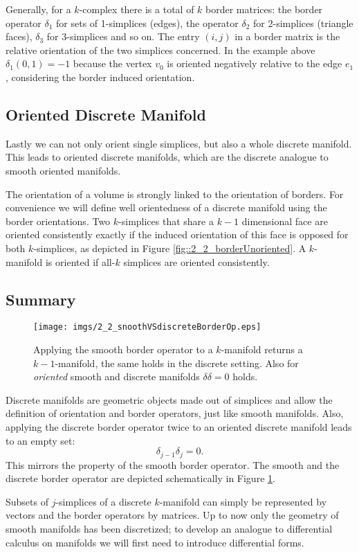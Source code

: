 Generally, for a $k$-complex there is a total of $k$ border matrices: the border operator $\delta_1$ for sets of 1-simplices (edges), the operator $\delta_2$ for 2-simplices (triangle faces), $\delta_3$ for 3-simplices and so on. %
The entry $(i,j)$ in a border matrix is the relative orientation of the two simplices concerned. In the example above $\delta_1(0,1) = -1$ because the vertex $v_0$ is oriented negatively relative to the edge $e_1$, considering the border induced orientation.

\subsection{Oriented Discrete Manifold}
\label{sec::2_orientedDiscreteMF}
Lastly we can not only orient single simplices, but also a whole discrete manifold. This leads to oriented discrete manifolds, which are the discrete analogue to smooth oriented manifolds. 

The orientation of a volume is strongly linked to the orientation of borders. For convenience we will define well orientedness of a discrete manifold using the border orientations.
Two $k$-simplices that share a $k-1$ dimensional face are oriented consistently exactly if the induced orientation of this face is opposed for both $k$-simplices, as depicted in Figure \ref{fig::2_2_borderUnoriented}.
A $k$-manifold is oriented if all-$k$ simplices are oriented consistently. 

\subsection{Summary}

\begin{figure}%
\begin{center}
\texttt{[image: imgs/2\_2\_snoothVSdiscreteBorderOp.eps]}	
\end{center}
\caption{Applying the smooth border operator to a $k$-manifold returns a $k-1$-manifold, the same holds in the discrete setting. Also for \emph{oriented} smooth and discrete manifolds $\delta\delta = 0$ holds.}%
\label{fig:2_2_snoothVSdiscreteBorderOp}%
\end{figure}
Discrete manifolds are geometric objects made out of simplices and allow the definition of orientation and border operators, just like smooth manifolds. Also, applying the discrete border operator twice to an oriented discrete manifold leads to an empty set:
\[\delta_{j-1}\delta_{j} = 0.\]
This mirrors the property of the smooth border operator. The smooth and the discrete border operator are depicted schematically in Figure \ref{fig:2_2_snoothVSdiscreteBorderOp}.

Subsets of $j$-simplices of a discrete $k$-manifold can simply be represented by vectors and the border operators by matrices.  Up to now only the geometry of smooth manifolds has been discretized; to develop an analogue to differential calculus on manifolds we will first need to introduce differential forms.
